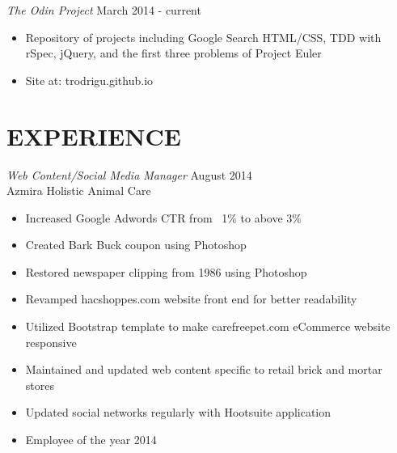 \documentclass[margin]{res}
\begin{document}
\begin{resume}
  {\sl The Odin Project} \hfill March 2014 - current \\
  \begin{itemize}
      \item Repository of projects including Google Search HTML/CSS, TDD with rSpec, jQuery, and the first three problems of Project Euler
      \item Site at: trodrigu.github.io
  \end{itemize} 

\section{EXPERIENCE} 

  {\sl Web Content/Social Media Manager} \hfill August 2014 \\
  Azmira Holistic Animal Care
  \begin{itemize}
      \item Increased Google Adwords CTR from ~1\% to above 3\%
      \item Created Bark Buck coupon using Photoshop
      \item Restored newspaper clipping from 1986 using Photoshop
      \item Revamped hacshoppes.com website front end for better readability
      \item Utilized Bootstrap template to make carefreepet.com eCommerce website responsive
      \item Maintained and updated web content specific to retail brick and mortar stores
      \item Updated social networks regularly with Hootsuite application
      \item Employee of the year 2014
  \end{itemize}


\end{resume}
\end{document}
